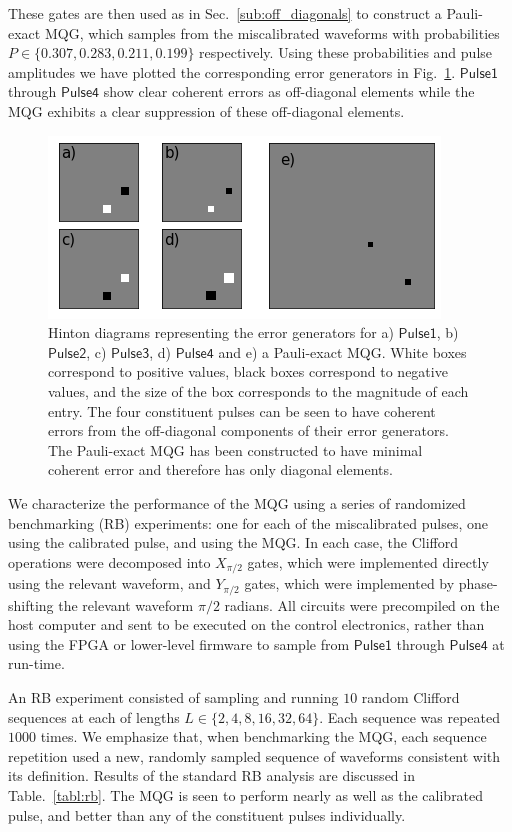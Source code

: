 \documentclass[aps,nofootinbib,pra,notitlepage,twocolumn]{revtex4-1}
\newcommand{\0}{\ensuremath{\mathbf{0}}}
\begin{document}
 These gates are then used as in Sec.~\ref{sub:off_diagonals} to construct a Pauli-exact MQG, which samples from the miscalibrated waveforms with probabilities $P\in \{0.307, 0.283, 0.211, 0.199\}$ respectively. Using these probabilities and pulse amplitudes we have plotted the corresponding error generators in Fig.~\ref{fig:ptms}. $\mathsf{Pulse1}$ through $\mathsf{Pulse4}$ show clear coherent errors as off-diagonal elements while the MQG exhibits a clear suppression of these off-diagonal elements.
\begin{figure}
\includegraphics[scale=.5]{experimental-ptm.png}
\caption{Hinton diagrams representing the error generators for a) $\mathsf{Pulse1}$, b) $\mathsf{Pulse2}$, c) $\mathsf{Pulse3}$, d) $\mathsf{Pulse4}$ and e) a Pauli-exact MQG. White boxes correspond to positive values, black  boxes correspond to negative values, and the size of the box corresponds to the magnitude of each entry. The four constituent pulses can be seen to have coherent errors from the off-diagonal components of their error generators. The Pauli-exact MQG has been constructed to have minimal coherent error and therefore has only diagonal elements.}   
\label{fig:ptms}
\end{figure}

We characterize the performance of the MQG using a series of randomized benchmarking (RB) experiments\cite{Magesan2011}: one for each of the miscalibrated pulses, one using the calibrated pulse, and using the MQG. In each case, the Clifford operations were decomposed into $X_{\pi/2}$ gates, which were implemented directly using the relevant waveform, and $Y_{\pi/2}$ gates, which were implemented by phase-shifting the relevant waveform $\pi/2$ radians. All circuits were precompiled on the host computer and sent to be executed on the control electronics, rather than using the FPGA or lower-level firmware to sample from $\mathsf{Pulse1}$ through $\mathsf{Pulse4}$ at run-time.

An RB experiment consisted of sampling and running $10$ random Clifford sequences at each of lengths $L\in\{2, 4, 8, 16, 32, 64\}$. Each sequence was repeated $1000$ times. We emphasize that, when benchmarking the MQG, each sequence repetition used a new, randomly sampled sequence of waveforms consistent with its definition. Results of the standard RB analysis are discussed in Table.~\ref{tabl:rb}. The MQG is seen to perform nearly as well as the calibrated pulse, and better than any of the constituent pulses individually. 
\end{document}
